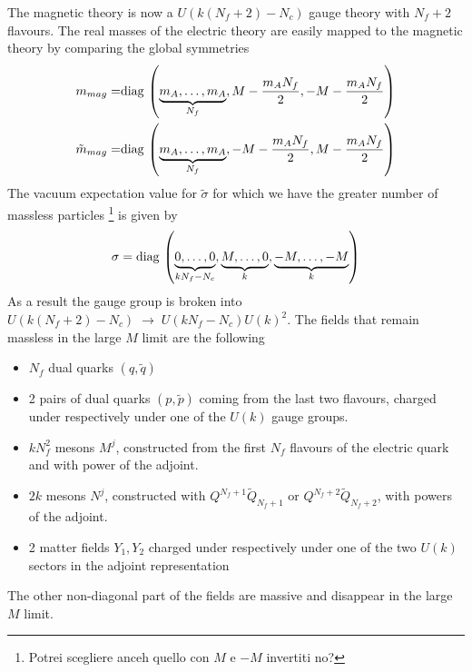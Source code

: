 The magnetic theory is now a $U(k(N_f + 2) - N_c)$ gauge theory with $N_f +2$ flavours. 
The real masses of the electric theory are easily mapped to the magnetic theory by comparing the global symmetries
\begin{align}
 m_{mag} =&    \hbox{diag\,} \left(  \underbrace{m_A , \dotsc, m_A}_{N_f} ,  M- \frac{m_A N_f}{2} , -M -\frac{m_A N_f}{2}\right)  \\
  \tilde{m}_{mag} =& \hbox{diag\,} \left(
  \underbrace{
  m_A,\dotsc,m_A
}_{N_f}
  , -M - \frac{m_A N_f}{2}, M - \frac{m_A N_f}{2}\right)
\end{align}
The vacuum expectation value for $\tilde{\sigma}$ for which we have the greater number of massless particles 
\footnote{Potrei scegliere anceh quello con $M$ e $-M$ invertiti no?}
 is given by
\begin{equation}
\sigma = \hbox{diag\,} 
\left(   
\underbrace{0,\dotsc,0}_{k N_f - N_c},
\underbrace{M, \dotsc,0}_{k},
\underbrace{-M, \dotsc, -M}_{k} 
\right)
\end{equation}
As a result the gauge group is broken into $U(k (N_f +2) - N_c) \; \rightarrow \; U(k N_f - N_c) U(k)^2$.
The fields that remain massless in the large $M$ limit are the following
\begin{itemize}
\item $N_f$ dual quarks $(q,\tilde{q})$ 
\item 2 pairs of dual quarks $ (p,\tilde{p})$ coming from the last two flavours, charged under respectively under one of the $U(k)$ gauge groups.
\item $k N_f^2$ mesons $M^j$, constructed from the first $N_f$ flavours of the electric quark and with power of the adjoint.
\item $2k$ mesons $N^j$, constructed with $ Q ^{N_f+1}\tilde{Q}_{N_f+1}$ or $ Q ^{N_f+2}\tilde{Q}_{N_f+2}$, with powers of the adjoint.
\item 2 matter fields $Y_1,Y_2$ charged under respectively under one of the two $U(k)$ sectors in the adjoint representation
\end{itemize}
The other non-diagonal part of the fields are massive and disappear in the large $M$ limit.


